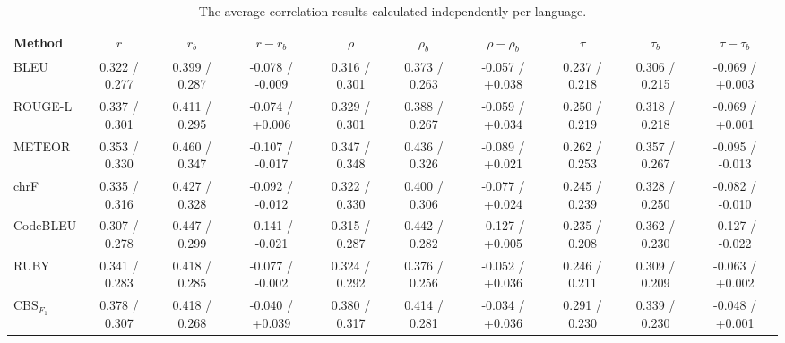 \begin{table}[t]
    \centering
    \scriptsize
    \setlength{\tabcolsep}{3.5pt}
    \caption{The average correlation results calculated independently per language.}
    \label{tab:unified-settings}
    \begin{tabular}{@{}
        l|ccc|ccc|ccc@{}}
        \toprule
        Method & $r$ & $r_b$ & $r-r_b$ & $\rho$ & $\rho_b$ & $\rho-\rho_b$ & $\tau$ & $\tau_b$ & $\tau-\tau_b$ \\
        \midrule
        \midrule
        BLEU                    & 0.322 / 0.277   & 0.399 / 0.287   & -0.078 / -0.009                     & 0.316 / 0.301   & 0.373 / 0.263   & -0.057 / +0.038                     & 0.237 / 0.218   & 0.306 / 0.215   & -0.069 / +0.003                     \\
        ROUGE-L                 & 0.337 / 0.301   & 0.411 / 0.295   & -0.074 / +0.006                     & 0.329 / 0.301   & 0.388 / 0.267   & -0.059 / +0.034                     & 0.250 / 0.219   & 0.318 / 0.218   & -0.069 / +0.001                     \\
        METEOR                  & 0.353 / 0.330   & 0.460 / 0.347   & -0.107 / -0.017                     & 0.347 / 0.348   & 0.436 / 0.326   & -0.089 / +0.021                     & 0.262 / 0.253   & 0.357 / 0.267   & -0.095 / -0.013                     \\
        chrF                    & 0.335 / 0.316   & 0.427 / 0.328   & -0.092 / -0.012                     & 0.322 / 0.330   & 0.400 / 0.306   & -0.077 / +0.024                     & 0.245 / 0.239   & 0.328 / 0.250   & -0.082 / -0.010                     \\
        CodeBLEU                & 0.307 / 0.278   & 0.447 / 0.299   & -0.141 / -0.021                     & 0.315 / 0.287   & 0.442 / 0.282   & -0.127 / +0.005                     & 0.235 / 0.208   & 0.362 / 0.230   & -0.127 / -0.022                     \\
        RUBY                    & 0.341 / 0.283   & 0.418 / 0.285   & -0.077 / -0.002                     & 0.324 / 0.292   & 0.376 / 0.256   & -0.052 / +0.036                     & 0.246 / 0.211   & 0.309 / 0.209   & -0.063 / +0.002                     \\
        CBS$_{F_1}$             & 0.378 / 0.307   & 0.418 / 0.268   & -0.040 / +0.039                     & 0.380 / 0.317   & 0.414 / 0.281   & -0.034 / +0.036                     & 0.291 / 0.230   & 0.339 / 0.230   & -0.048 / +0.001                     \\

\end{tabular}
\end{table}
